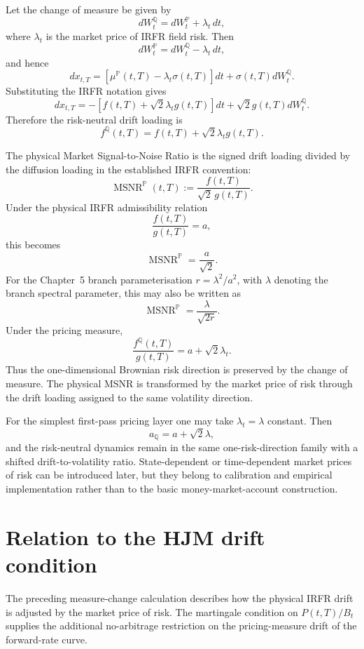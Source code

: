 \documentclass[11pt,oneside]{book}
\begin{document}
Let the change of measure be given by
\[
dW_t^{\mathbb Q}=dW_t^{\mathbb P}+\lambda_t\,dt,
\]
where \(\lambda_t\) is the market price of IRFR field risk. Then
\[
dW_t^{\mathbb P}=dW_t^{\mathbb Q}-\lambda_t\,dt,
\]
and hence
\[
dx_{t,T}
=
\left[\mu^{\mathbb P}(t,T)-\lambda_t\sigma(t,T)\right]dt
+
\sigma(t,T)dW_t^{\mathbb Q}.
\]
Substituting the IRFR notation gives
\[
dx_{t,T}
=
-\left[f(t,T)+\sqrt{2}\lambda_t g(t,T)\right]dt
+
\sqrt{2}g(t,T)dW_t^{\mathbb Q}.
\]
Therefore the risk-neutral drift loading is
\[
f^{\mathbb Q}(t,T)
=
f(t,T)+\sqrt{2}\lambda_t g(t,T).
\]

The physical Market Signal-to-Noise Ratio is the signed drift loading divided
by the diffusion loading in the established IRFR convention:
\[
\operatorname{MSNR}^{\mathbb P}(t,T)
:=
\frac{f(t,T)}{\sqrt{2}\,g(t,T)}.
\]
Under the physical IRFR admissibility relation
\[
\frac{f(t,T)}{g(t,T)}=a,
\]
this becomes
\[
\operatorname{MSNR}^{\mathbb P}=\frac{a}{\sqrt{2}}.
\]
For the Chapter~5 branch parameterisation \(r=\lambda^2/a^2\), with \(\lambda\) denoting the branch spectral parameter, this may also be written as
\[
\operatorname{MSNR}^{\mathbb P}=\frac{\lambda}{\sqrt{2r}}.
\]
Under the pricing measure,
\[
\frac{f^{\mathbb Q}(t,T)}{g(t,T)}
=
a+
\sqrt{2}\lambda_t.
\]
Thus the one-dimensional Brownian risk direction is preserved by the
change of measure. The physical MSNR is transformed by the market price
of risk through the drift loading assigned to the same volatility direction.

For the simplest first-pass pricing layer one may take \(\lambda_t=\lambda\)
constant. Then
\[
a_{\mathbb Q}=a+\sqrt{2}\lambda,
\]
and the risk-neutral dynamics remain in the same one-risk-direction
family with a shifted drift-to-volatility ratio. State-dependent or
time-dependent market prices of risk can be introduced later, but they
belong to calibration and empirical implementation rather than to the
basic money-market-account construction.


\section{Relation to the HJM drift condition}
\label{relation-to-the-hjm-drift-condition}

The preceding measure-change calculation describes how the physical IRFR
drift is adjusted by the market price of risk. The martingale condition on
\(P(t,T)/B_t\) supplies the additional no-arbitrage restriction on the
pricing-measure drift of the forward-rate curve.
\end{document}
